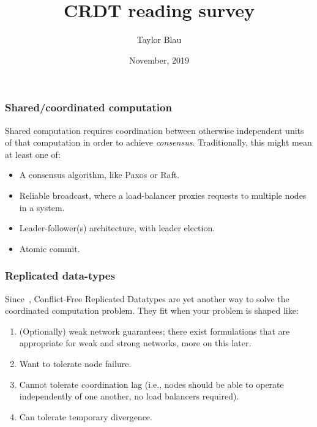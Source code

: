 \documentclass[aspectratio=169,compress]{beamer}
\title{CRDT reading survey}
\author{Taylor Blau}
\institute{University of Washington}
\date{November, 2019}
\begin{document}
  \frame{\titlepage}

  \begin{frame}
    \frametitle{Shared/coordinated computation}

    Shared computation requires coordination between otherwise independent units
    of that computation in order to achieve \textit{consensus}. Traditionally,
    this might mean at least one of:

    \begin{itemize}
      \item A consensus algorithm, like Paxos or Raft.
      \item Reliable broadcast, where a load-balancer proxies requests to
        multiple nodes in a system.
      \item Leader-follower(s) architecture, with leader election.
      \item Atomic commit.
    \end{itemize}
  \end{frame}

  \begin{frame}
    \frametitle{Replicated data-types}

    Since~\cite{shapiro11}, Conflict-Free Replicated Datatypes are yet another
    way to solve the coordinated computation problem. They fit when your problem
    is shaped like:
    \begin{enumerate}
      \item (Optionally) weak network guarantees; there exist formulations that
        are appropriate for weak and strong networks, more on this later.
      \item Want to tolerate node failure.
      \item Cannot tolerate coordination lag (i.e., nodes should be able to
        operate independently of one another, no load balancers required).
      \item Can tolerate temporary divergence.
    \end{enumerate}
  \end{frame}
\end{document}
